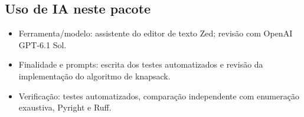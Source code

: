 \subsection*{Uso de IA neste pacote}
\begin{itemize}
  \item Ferramenta/modelo: assistente do editor de texto Zed; revisão com OpenAI GPT-6.1 Sol.
  \item Finalidade e prompts: escrita dos testes automatizados e revisão da implementação do algoritmo de knapsack.
  \item Verificação: testes automatizados, comparação independente com enumeração exaustiva, Pyright e Ruff.
\end{itemize}
